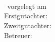 \begin{titlepage}
	\thesisDate \\

\end{titlepage}


\hfill
\vfill
{
	\small
	\textbf{\thesisName} \\
	\textit{\thesisTitle} \\
	\thesisSubject\ vorgelegt am \thesisDate \\
	Erstgutachter: \thesisReviewer \\
	Zweitgutachter: \thesisSupervisor \\
	Betreuer: \thesisReviewer \\[1.5em]
	
	\textbf{\thesisUniversity} \\
	\textit{\thesisUniversityGroup} \\
	\thesisUniversityInstitute \\
	\thesisUniversityDepartment \\
	\thesisUniversityStreetAddress \\
	\thesisUniversityPostalCode\ \thesisUniversityCity
}
